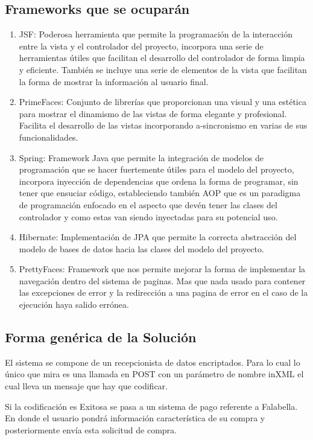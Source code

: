 \documentclass[a4paper,12pt,openany,oneside]{book}
\begin{document}
\subsection{Frameworks que se ocuparán}
\begin{enumerate}
\item JSF: Poderosa herramienta que permite la programación de la interacción entre la vista y el controlador del proyecto, incorpora una serie de herramientas útiles que facilitan el desarrollo del controlador de forma limpia y eficiente. También se incluye una serie de elementos de la vista que facilitan la forma de mostrar la información al usuario final.
\item PrimeFaces: Conjunto de librerías que proporcionan una visual y una estética para mostrar el dinamismo de las vistas de forma elegante y profesional. Facilita el desarrollo de las vistas incorporando a-sincronismo en varias de sus funcionalidades. 
\item Spring: Framework Java que permite la integración de modelos de programación que se hacer fuertemente útiles para el modelo del proyecto, incorpora inyección de dependencias que ordena la forma de programar, sin tener que ensuciar código, estableciendo también AOP que es un paradigma de programación enfocado en el aspecto que devén tener las clases del controlador y como estas van siendo inyectadas para su potencial uso. 
\item Hibernate: Implementación de JPA que permite la correcta abstracción del modelo de bases de datos hacia las clases del modelo del proyecto.
\item PrettyFaces: Framework que nos permite mejorar la forma de implementar la navegación dentro del sistema de paginas. Mas que nada usado para contener las excepciones de error y la redirección a una pagina de error en el caso de la ejecución haya salido errónea.
\end{enumerate}
\subsection{Forma genérica de la Solución}
El sistema se compone de un recepcionista de datos encriptados. Para lo cual lo único que mira es una llamada en POST con un parámetro de nombre inXML el cual lleva un mensaje que hay que codificar.

Si la codificación es Exitosa se pasa a un sistema de pago referente a Falabella. En donde el usuario pondrá información característica de su compra y posteriormente envía esta solicitud de compra.
\end{document}
